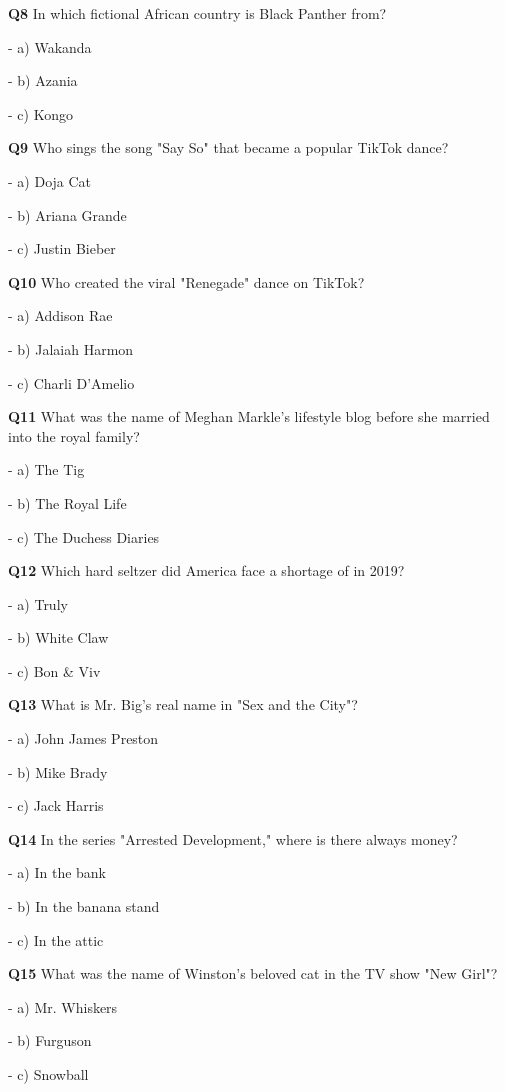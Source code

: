 \textbf{Q8} In which fictional African country is Black Panther from?\par
\quad - a) Wakanda\par
\quad - b) Azania\par
\quad - c) Kongo\par

\textbf{Q9} Who sings the song "Say So" that became a popular TikTok dance?\par
\quad - a) Doja Cat\par
\quad - b) Ariana Grande\par
\quad - c) Justin Bieber\par

\textbf{Q10} Who created the viral "Renegade" dance on TikTok?\par
\quad - a) Addison Rae\par
\quad - b) Jalaiah Harmon\par
\quad - c) Charli D'Amelio\par

\textbf{Q11} What was the name of Meghan Markle's lifestyle blog before she married into the royal family?\par
\quad - a) The Tig\par
\quad - b) The Royal Life\par
\quad - c) The Duchess Diaries\par

\textbf{Q12} Which hard seltzer did America face a shortage of in 2019?\par
\quad - a) Truly\par
\quad - b) White Claw\par
\quad - c) Bon & Viv\par

\textbf{Q13} What is Mr. Big's real name in "Sex and the City"?\par
\quad - a) John James Preston\par
\quad - b) Mike Brady\par
\quad - c) Jack Harris\par

\textbf{Q14} In the series "Arrested Development," where is there always money?\par
\quad - a) In the bank\par
\quad - b) In the banana stand\par
\quad - c) In the attic\par

\textbf{Q15} What was the name of Winston's beloved cat in the TV show "New Girl"?\par
\quad - a) Mr. Whiskers\par
\quad - b) Furguson\par
\quad - c) Snowball\par

